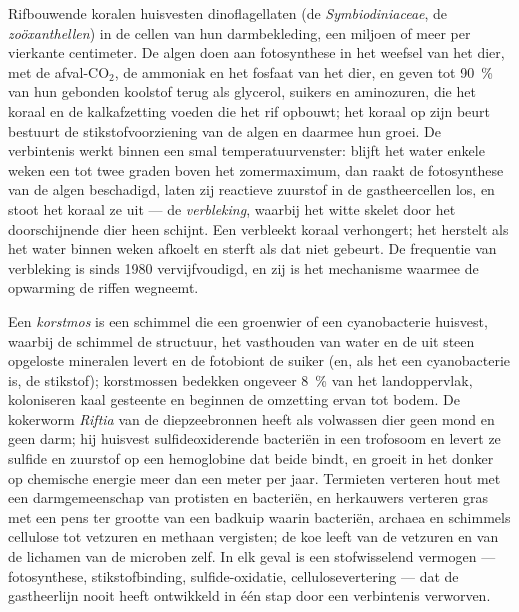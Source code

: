 \begin{definition}\label{def:b3:microbiomes:coral}
Rifbouwende koralen huisvesten dinoflagellaten (de
\emph{Symbiodiniaceae}, de \emph{zoöxanthellen}) in de cellen van hun
darmbekleding, een miljoen of meer per vierkante centimeter. De algen
doen aan fotosynthese in het weefsel van het dier, met de afval-CO$_{2}$,
de ammoniak en het fosfaat van het dier, en geven tot \qty{90}{\%} van
hun gebonden koolstof terug als glycerol, suikers en aminozuren, die
het koraal en de kalkafzetting voeden die het rif opbouwt; het koraal
op zijn beurt bestuurt de stikstofvoorziening van de algen en daarmee
hun groei. De verbintenis werkt binnen een smal temperatuurvenster:
blijft het water enkele weken een tot twee graden boven het
zomermaximum, dan raakt de fotosynthese van de algen beschadigd, laten
zij reactieve zuurstof in de gastheercellen los, en stoot het koraal ze
uit --- de \emph{verbleking}, waarbij het witte skelet door het
doorschijnende dier heen schijnt. Een verbleekt koraal verhongert; het
herstelt als het water binnen weken afkoelt en sterft als dat niet
gebeurt. De frequentie van verbleking is sinds 1980 vervijfvoudigd, en
zij is het mechanisme waarmee de opwarming de riffen wegneemt.
\end{definition}

\begin{example}\label{ex:b3:microbiomes:habitats}
Een \emph{korstmos} is een schimmel die een groenwier of een
cyanobacterie huisvest, waarbij de schimmel de structuur, het
vasthouden van water en de uit steen opgeloste mineralen levert en de
fotobiont de suiker (en, als het een cyanobacterie is, de stikstof);
korstmossen bedekken ongeveer \qty{8}{\%} van het landoppervlak,
koloniseren kaal gesteente en beginnen de omzetting ervan tot bodem. De
kokerworm \emph{Riftia} van de diepzeebronnen heeft als volwassen dier
geen mond en geen darm; hij huisvest sulfideoxiderende bacteriën in een
trofosoom en levert ze sulfide en zuurstof op een hemoglobine dat beide
bindt, en groeit in het donker op chemische energie meer dan een meter
per jaar. Termieten verteren hout met een darmgemeenschap van protisten
en bacteriën, en herkauwers verteren gras met een pens ter grootte van
een badkuip waarin bacteriën, archaea en schimmels cellulose tot
vetzuren en methaan vergisten; de koe leeft van de vetzuren en van de
lichamen van de microben zelf. In elk geval is een stofwisselend
vermogen --- fotosynthese, stikstofbinding, sulfide-oxidatie,
cellulosevertering --- dat de gastheerlijn nooit heeft ontwikkeld in
één stap door een verbintenis verworven.
\end{example}

